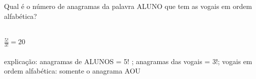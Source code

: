 \begin{ex}
 Qual é o número de anagramas da palavra ALUNO que tem as vogais em ordem alfabética?
  \begin{sol}
      \phantom{A} \\
  $ \frac{5!}{3!} = 20$ \\ \\
    explicação: anagramas de ALUNOS = 5! \hspace{.1cm}; anagramas das vogais = 3!\hspace{.1cm}; vogais em ordem alfabética: somente o anagrama AOU
  \end{sol}
\end{ex}